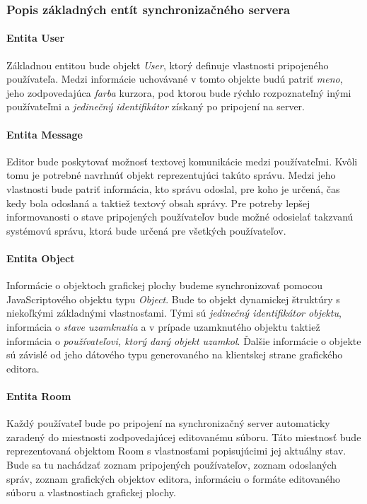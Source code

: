 \subsubsection{Popis základných entít synchronizačného servera}
\paragraph{Entita User}

Základnou entitou bude objekt \textit{User}, ktorý definuje vlastnosti pripojeného používateľa. Medzi informácie uchovávané v tomto objekte budú patriť \textit{meno}, jeho zodpovedajúca \textit{farba} kurzora, pod ktorou bude rýchlo rozpoznateľný inými používateľmi a \textit{jedinečný identifikátor} získaný po pripojení na server.

\paragraph{Entita Message}
Editor bude poskytovať možnosť textovej komunikácie medzi používateľmi. Kvôli tomu je potrebné navrhnúť objekt reprezentujúci takúto správu. Medzi jeho vlastnosti bude patriť informácia, kto správu odoslal, pre koho je určená, čas kedy bola odoslaná a taktiež textový obsah správy. Pre potreby lepšej informovanosti o stave pripojených používateľov bude možné odosielať takzvanú systémovú správu, ktorá bude určená pre všetkých používateľov.

\paragraph{Entita Object}
Informácie o objektoch grafickej plochy budeme synchronizovať pomocou JavaScriptového objektu typu \textit{Object}. Bude to objekt dynamickej štruktúry s niekoľkými základnými vlastnosťami. Tými sú \textit{jedinečný identifikátor objektu}, informácia o \textit{stave uzamknutia} a v prípade uzamknutého objektu taktiež informácia o \textit{používateľovi, ktorý daný objekt uzamkol}. Ďalšie informácie o objekte sú závislé od jeho dátového typu generovaného na klientskej strane grafického editora.

\paragraph{Entita Room}
Každý používateľ bude po pripojení na synchronizačný server automaticky zaradený do miestnosti zodpovedajúcej editovanému súboru. Táto miestnosť bude reprezentovaná objektom Room s vlastnosťami popisujúcimi jej aktuálny stav. Bude sa tu nachádzať zoznam pripojených používateľov, zoznam odoslaných správ, zoznam grafických objektov editora, informáciu o formáte editovaného súboru a vlastnostiach grafickej plochy.

